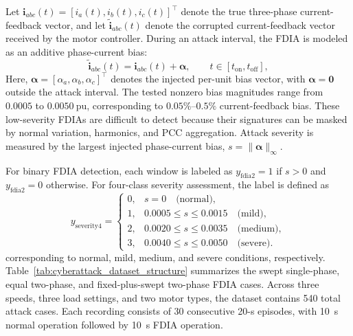 \documentclass[lettersize,journal]{IEEEtran}
\begin{document}
Let $\mathbf{i}_{abc}(t)=[i_a(t),i_b(t),i_c(t)]^\top$ denote the true three-phase current-feedback vector, and let $\tilde{\mathbf{i}}_{abc}(t)$ denote the corrupted current-feedback vector received by the motor controller. During an attack interval, the FDIA is modeled as an additive phase-current bias:
\begin{equation}
\tilde{\mathbf{i}}_{abc}(t)
=
\mathbf{i}_{abc}(t)+\boldsymbol{\alpha},
\qquad t\in[t_{\mathrm{on}},t_{\mathrm{off}}],
\label{eq:fdia_model}
\end{equation}
Here, \(\boldsymbol{\alpha}=[\alpha_a,\alpha_b,\alpha_c]^\top\) denotes the injected per-unit bias vector, with \(\boldsymbol{\alpha}=\mathbf{0}\) outside the attack interval. The tested nonzero bias magnitudes range from \(0.0005\) to \(0.0050~\mathrm{pu}\), corresponding to \(0.05\%\)--\(0.5\%\) current-feedback bias. These low-severity FDIAs are difficult to detect because their signatures can be masked by normal variation, harmonics, and PCC aggregation. Attack severity is measured by the largest injected phase-current bias, 
\(s=\|\boldsymbol{\alpha}\|_\infty\).

For binary FDIA detection, each window is labeled as
$y_{\mathrm{fdia2}}=1$ if $s>0$ and $y_{\mathrm{fdia2}}=0$ otherwise. 
For four-class severity assessment, the label is defined as
\begin{equation}
y_{\mathrm{severity4}} =
\begin{cases}
0, & s=0 \quad \text{(normal)},\\
1, & 0.0005 \leq s \leq 0.0015 \quad \text{(mild)},\\
2, & 0.0020 \leq s \leq 0.0035 \quad \text{(medium)},\\
3, & 0.0040 \leq s \leq 0.0050 \quad \text{(severe)}.
\end{cases}
\label{eq:severity_bins}
\end{equation}
corresponding to normal, mild, medium, and severe conditions, respectively.
Table~\ref{tab:cyberattack_dataset_structure} summarizes the swept single-phase, equal two-phase, and fixed-plus-swept two-phase FDIA cases. Across three speeds, three load settings, and two motor types, the dataset contains 540 total attack cases. Each recording consists of 30 consecutive 20-s episodes, with 10~s normal operation followed by 10~s FDIA operation.
\end{document}
